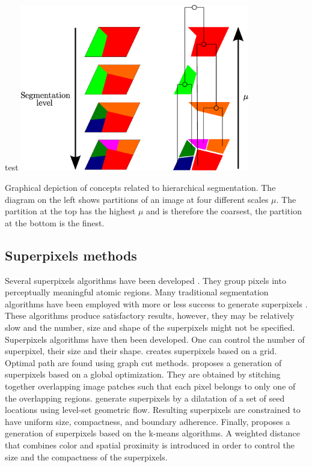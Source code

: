 \begin{figurethesis}{test}
\includegraphics[width=0.75\textwidth]{Figures/seg_hierar}
\caption{Graphical depiction of concepts related to hierarchical segmentation. The diagram on the left shows partitions of an image at four different scales $\mu$. The partition at the top has the highest $\mu$ and is therefore the coarsest, the partition at the bottom is the finest.}
\label{fig:seg_hierar}
\end{figurethesis}


\subsection{Superpixels methods}
Several superpixels algorithms have been developed \citep{achanta2012slic}. They group pixels into perceptually meaningful atomic regions. Many traditional segmentation algorithms have been employed with more or less success to generate superpixels \citep{shi2000normalized, felzenszwalb2004efficient, comaniciu2002mean, vedaldi2008quick, vincent1991watersheds}. These algorithms produce satisfactory results, however, they may be relatively slow and the number, size and shape of the superpixels might not be specified. \\

Superpixels algorithms have then been developed. One can control the number of superpixel, their size and their shape. \cite{moore2008superpixel} creates superpixels based on a grid. Optimal path are found using graph cut methods. \cite{veksler2010superpixels} proposes a generation of superpixels based on a global optimization. They are obtained by stitching together overlapping image patches such that each pixel belongs to only one of the overlapping regions. \cite{levinshtein2009turbopixels} generate superpixels by a dilatation of a set of seed locations using level-set geometric flow. Resulting superpixels are constrained to have uniform size, compactness, and boundary adherence. Finally, \cite{achanta2012slic} proposes a generation of superpixels based on the k-means algorithms. A weighted distance that combines color and spatial proximity is introduced in order to control the size and the compactness of the superpixels.


